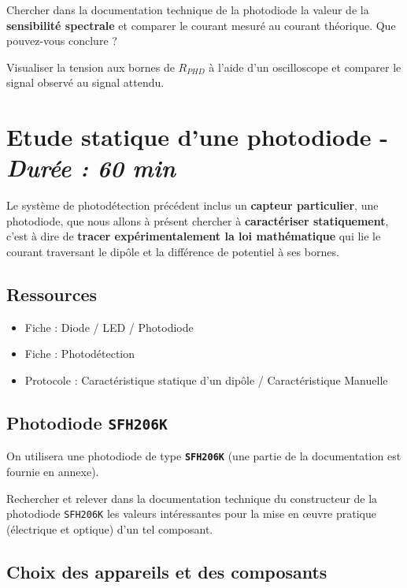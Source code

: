 \Quest Chercher dans la documentation technique de la photodiode la valeur de la \textbf{sensibilité spectrale} et comparer le courant mesuré au courant théorique. Que pouvez-vous conclure ?

\Manip Visualiser la tension aux bornes de $R_{PHD}$ à l'aide d'un oscilloscope et comparer le signal observé au signal attendu. 


\clearpage
\section{Etude statique d'une photodiode - \textit{Durée : 60 min}}

Le système de photodétection précédent inclus un \textbf{capteur particulier}, une photodiode, que nous allons à présent chercher à \textbf{caractériser statiquement}, c'est à dire de \textbf{tracer expérimentalement la loi mathématique} qui lie le courant traversant le dipôle et la différence de potentiel à ses bornes.


\subsection{Ressources}

\begin{itemize}
	\item Fiche : Diode / LED / Photodiode
	\item Fiche : Photodétection
	\item Protocole : Caractéristique statique d'un dipôle / Caractéristique Manuelle
\end{itemize}


\subsection{Photodiode \texttt{SFH206K}}

On utilisera une photodiode de type \textbf{\texttt{SFH206K}} (une partie de la documentation est fournie en annexe).

\Quest Rechercher et relever dans la documentation technique du constructeur de la photodiode \texttt{SFH206K} les valeurs intéressantes pour la mise en \oe{}uvre pratique (électrique et optique) d'un tel composant.


\subsection{Choix des appareils et des composants}

